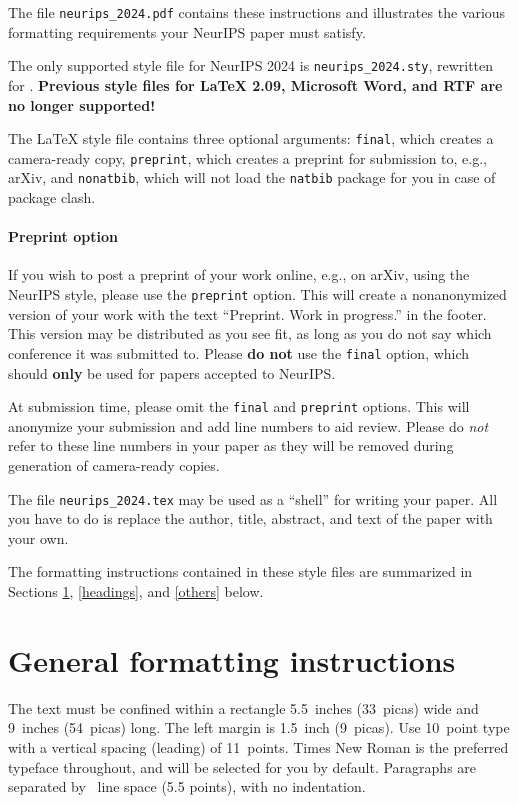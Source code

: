 \documentclass{article}
\begin{document}
The file \verb+neurips_2024.pdf+ contains these instructions and illustrates the various formatting requirements your NeurIPS paper must satisfy.

The only supported style file for NeurIPS 2024 is \verb+neurips_2024.sty+, rewritten for \LaTeXe{}. \textbf{Previous style files for \LaTeX{} 2.09, Microsoft Word, and RTF are no longer supported!}

The \LaTeX{} style file contains three optional arguments: \verb+final+, which creates a camera-ready copy, \verb+preprint+, which creates a preprint for submission to, e.g., arXiv, and \verb+nonatbib+, which will not load the \verb+natbib+ package for you in case of package clash.

\paragraph{Preprint option}

If you wish to post a preprint of your work online, e.g., on arXiv, using the NeurIPS style, please use the \verb+preprint+ option. This will create a nonanonymized version of your work with the text ``Preprint. Work in progress.'' in the footer. This version may be distributed as you see fit, as long as you do not say which conference it was submitted to. Please \textbf{do not} use the \verb+final+ option, which should \textbf{only} be used for papers accepted to NeurIPS.

At submission time, please omit the \verb+final+ and \verb+preprint+ options. This will anonymize your submission and add line numbers to aid review. Please do \emph{not} refer to these line numbers in your paper as they will be removed during generation of camera-ready copies.

The file \verb+neurips_2024.tex+ may be used as a ``shell'' for writing your paper. All you have to do is replace the author, title, abstract, and text of the paper with your own.

The formatting instructions contained in these style files are summarized in Sections \ref{gen_inst}, \ref{headings}, and \ref{others} below.

\section{General formatting instructions} \label{gen_inst}

The text must be confined within a rectangle 5.5~inches (33~picas) wide and 9~inches (54~picas) long. The left margin is 1.5~inch (9~picas). Use 10~point type with a vertical spacing (leading) of 11~points. Times New Roman is the preferred typeface throughout, and will be selected for you by default. Paragraphs are separated by ~line space (5.5 points), with no indentation.
\end{document}
